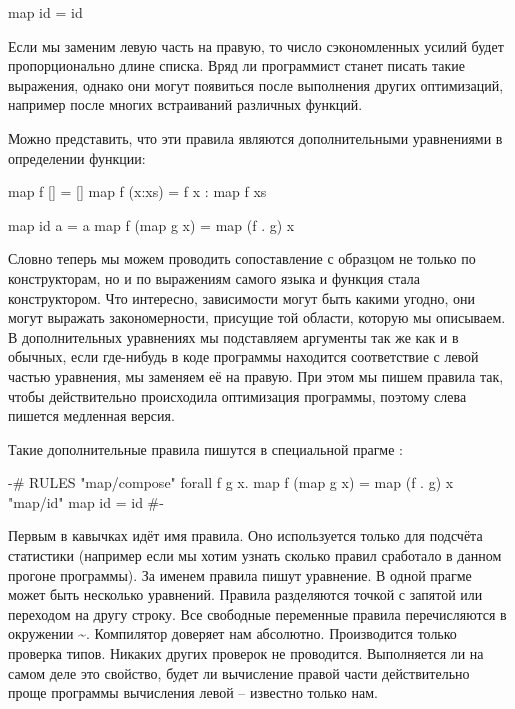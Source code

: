\begin{code}
map id = id
\end{code}

Если мы заменим левую часть на правую, то число сэкономленных усилий
будет пропорционально длине списка. Вряд ли программист станет писать
такие выражения, однако они могут появиться после выполнения других
оптимизаций, например после многих встраиваний различных функций.

Можно представить, что эти правила являются дополнительными уравнениями
в определении функции:


\begin{code}
map f []        = []
map f (x:xs)    = f x : map f xs

map id a        = a
map f (map g x) = map (f . g) x
\end{code}

Словно теперь мы можем проводить сопоставление с образцом не только по
конструкторам, но и по выражениям самого языка и функция  стала
конструктором. Что интересно, зависимости могут быть какими угодно, они
могут выражать закономерности, присущие той области, которую мы
описываем. В дополнительных уравнениях мы подставляем аргументы так же
как и в обычных, если где-нибудь в коде программы находится соответствие
с левой частью уравнения, мы заменяем её на правую. При этом мы пишем
правила так, чтобы действительно происходила оптимизация программы,
поэтому слева пишется медленная версия.

Такие дополнительные правила пишутся в специальной прагме :


\begin{code}
{-# RULES
    "map/compose"   forall f g x.  map f (map g x)  = map (f . g) x    
    "map/id"                       map id           = id 
#-}
\end{code}

Первым в кавычках идёт имя правила. Оно используется только для подсчёта
статистики (например если мы хотим узнать сколько правил сработало в
данном прогоне программы). За именем правила пишут уравнение. В одной
прагме может быть несколько уравнений. Правила разделяются точкой с
запятой или переходом на другу строку. Все свободные переменные правила
перечисляются в окружении \textasciitilde{}.
Компилятор доверяет нам абсолютно. Производится только проверка типов.
Никаких других проверок не проводится. Выполняется ли на самом деле это
свойство, будет ли вычисление правой части действительно проще программы
вычисления левой -- известно только нам.

